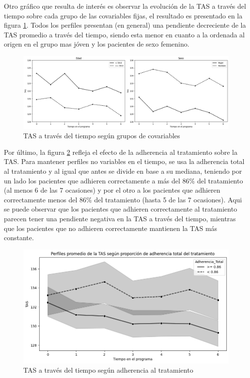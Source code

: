 \documentclass[spanish]{article}
\numberwithin{figure}{subsection}
\numberwithin{equation}{subsection}
\numberwithin{table}{subsection}
\begin{document}
Otro gráfico que resulta de interés es observar la evolución de la TAS a través
del tiempo sobre cada grupo de las covariables fijas, el resultado es presentado
en la figura \ref{TAS_with_covs}. Todos los perfiles presentan (en general) una
pendiente decreciente de la TAS promedio a través del tiempo, siendo esta menor
en cuanto a la ordenada al origen en el grupo mas jóven y los pacientes de sexo
femenino. 

\begin{figure}[H]
	\centering
	\includegraphics[scale=0.4]{img/TAS_vs_tpo_with_covs.png}
	\caption{TAS a través del tiempo según grupos de covariables}
	\label{TAS_with_covs}
\end{figure}

Por último, la figura \ref{TAS_with_adh} refleja el efecto de la adherencia al
tratamiento sobre la TAS. Para mantener perfiles no variables en el tiempo, se
usa la adherencia total al tratamiento y al igual que antes se divide en base a
su mediana, teniendo por un lado los pacientes que adhieren correctamente a más
del 86\% del tratamiento (al menos 6 de las 7 ocasiones) y por el otro a los
pacientes que adhieren correctamente menos del 86\% del tratamiento (hasta 5 de
las 7 ocasiones). Aqui se puede observar que los pacientes que adhieren
correctamente al tratamiento parecen tener una pendiente negativa en la TAS a
través del tiempo, mientras que los pacientes que no adhieren correctamente
mantienen la TAS más constante.

\begin{figure}[H]
	\centering
	\includegraphics[scale=0.5]{img/TAS_vs_tpo_with_adherencia.png}
	\caption{TAS a través del tiempo según adherencia al tratamiento}
	\label{TAS_with_adh}
\end{figure}
\end{document}

